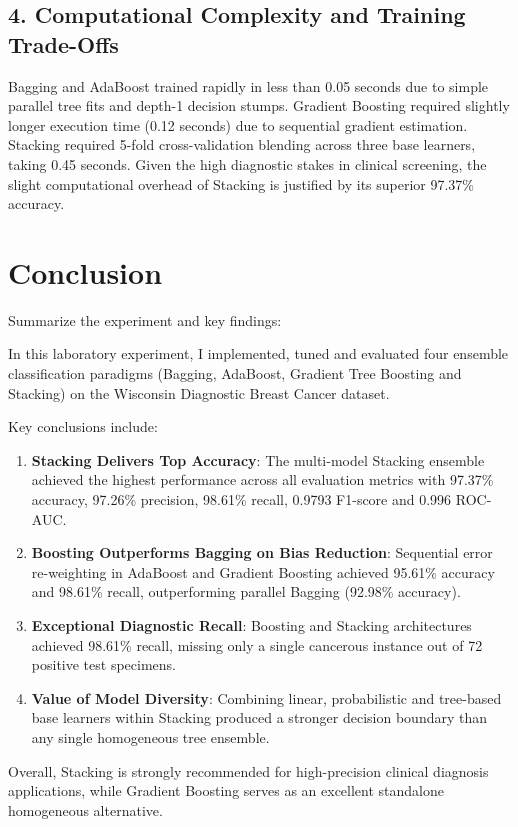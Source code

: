 \documentclass[12pt,a4paper]{article}
\begin{document}
\subsection*{4. Computational Complexity and Training Trade-Offs}
Bagging and AdaBoost trained rapidly in less than 0.05 seconds due to simple parallel tree fits and depth-1 decision stumps. Gradient Boosting required slightly longer execution time (0.12 seconds) due to sequential gradient estimation. Stacking required 5-fold cross-validation blending across three base learners, taking 0.45 seconds. Given the high diagnostic stakes in clinical screening, the slight computational overhead of Stacking is justified by its superior 97.37\% accuracy.

\section{Conclusion}
Summarize the experiment and key findings:

In this laboratory experiment, I implemented, tuned and evaluated four ensemble classification paradigms (Bagging, AdaBoost, Gradient Tree Boosting and Stacking) on the Wisconsin Diagnostic Breast Cancer dataset.

Key conclusions include:
\begin{enumerate}
\item \textbf{Stacking Delivers Top Accuracy}: The multi-model Stacking ensemble achieved the highest performance across all evaluation metrics with 97.37\% accuracy, 97.26\% precision, 98.61\% recall, 0.9793 F1-score and 0.996 ROC-AUC.
\item \textbf{Boosting Outperforms Bagging on Bias Reduction}: Sequential error re-weighting in AdaBoost and Gradient Boosting achieved 95.61\% accuracy and 98.61\% recall, outperforming parallel Bagging (92.98\% accuracy).
\item \textbf{Exceptional Diagnostic Recall}: Boosting and Stacking architectures achieved 98.61\% recall, missing only a single cancerous instance out of 72 positive test specimens.
\item \textbf{Value of Model Diversity}: Combining linear, probabilistic and tree-based base learners within Stacking produced a stronger decision boundary than any single homogeneous tree ensemble.
\end{enumerate}

Overall, Stacking is strongly recommended for high-precision clinical diagnosis applications, while Gradient Boosting serves as an excellent standalone homogeneous alternative.
\end{document}
